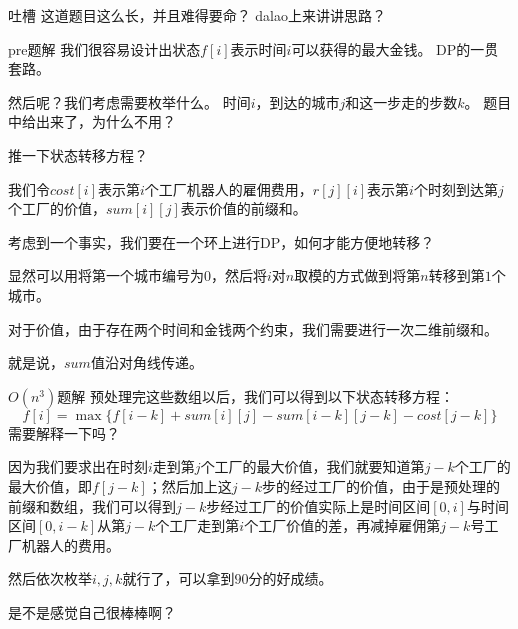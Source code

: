 \documentclass[UTF-8,aspectratio=1610]{ctexbeamer}
\begin{document}
\begin{frame}
\begin{exampleblock}{吐槽}
\pause
这道题目这么长，并且难得要命？
\pause
dalao上来讲讲思路？
\end{exampleblock}
\pause
\begin{alertblock}{pre题解}
\pause
我们很容易设计出状态$f[i]$表示时间$i$可以获得的最大金钱。
\pause
DP的一贯套路。
\pause

然后呢？我们考虑需要枚举什么。
\pause
时间$i$，到达的城市$j$和这一步走的步数$k$。
\pause
题目中给出来了，为什么不用？
\pause

推一下状态转移方程？
\pause

我们令$cost[i]$表示第$i$个工厂机器人的雇佣费用，$r[j][i]$表示第$i$个时刻到达第$j$个工厂的价值，$sum[i][j]$表示价值的前缀和。
\pause

考虑到一个事实，我们要在一个环上进行DP，如何才能方便地转移？
\pause

显然可以用将第一个城市编号为$0$，然后将$i$对$n$取模的方式做到将第$n$转移到第$1$个城市。
\pause

对于价值，由于存在两个时间和金钱两个约束，我们需要进行一次二维前缀和。
\pause

就是说，$sum$值沿对角线传递。
\end{alertblock}
\end{frame}
\begin{frame}
\begin{exampleblock}{$O(n^3)$题解}
\pause
预处理完这些数组以后，我们可以得到以下状态转移方程：
\pause
\begin{equation*}
f[i]=\max\{f[i-k]+sum[i][j]−sum[i-k][j-k]−cost[j−k]\}
\end{equation*}
\pause
需要解释一下吗？
\pause

因为我们要求出在时刻$i$走到第$j$个工厂的最大价值，我们就要知道第$j-k$个工厂的最大价值，即$f[j-k]$；然后加上这$j-k$步的经过工厂的价值，由于是预处理的前缀和数组，我们可以得到$j-k$步经过工厂的价值实际上是时间区间$[0,i]$与时间区间$[0,i-k]$从第$j-k$个工厂走到第$i$个工厂价值的差，再减掉雇佣第$j-k$号工厂机器人的费用。
\pause

然后依次枚举$i,j,k$就行了，可以拿到$90$分的好成绩。
\pause

是不是感觉自己很棒棒啊？
\end{exampleblock}
\end{frame}
\end{document}
